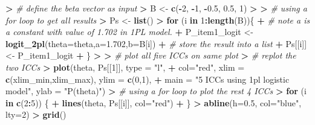 \documentclass[
]{article}
\newenvironment{Shaded}{\begin{snugshade}}{\end{snugshade}}
\newcommand{\AttributeTok}[1]{\textcolor[rgb]{0.13,0.29,0.53}{#1}}
\newcommand{\CommentTok}[1]{\textcolor[rgb]{0.56,0.35,0.01}{\textit{#1}}}
\newcommand{\ControlFlowTok}[1]{\textcolor[rgb]{0.13,0.29,0.53}{\textbf{#1}}}
\newcommand{\DecValTok}[1]{\textcolor[rgb]{0.00,0.00,0.81}{#1}}
\newcommand{\ErrorTok}[1]{\textcolor[rgb]{0.64,0.00,0.00}{\textbf{#1}}}
\newcommand{\FloatTok}[1]{\textcolor[rgb]{0.00,0.00,0.81}{#1}}
\newcommand{\FunctionTok}[1]{\textcolor[rgb]{0.13,0.29,0.53}{\textbf{#1}}}
\newcommand{\NormalTok}[1]{#1}
\newcommand{\OtherTok}[1]{\textcolor[rgb]{0.56,0.35,0.01}{#1}}
\newcommand{\SpecialCharTok}[1]{\textcolor[rgb]{0.81,0.36,0.00}{\textbf{#1}}}
\newcommand{\StringTok}[1]{\textcolor[rgb]{0.31,0.60,0.02}{#1}}
\begin{document}
\begin{Shaded}
\begin{Highlighting}[]
\SpecialCharTok{\textgreater{}} \CommentTok{\# define the beta vector as input}
\ErrorTok{\textgreater{}}\NormalTok{ B }\OtherTok{\textless{}{-}} \FunctionTok{c}\NormalTok{(}\SpecialCharTok{{-}}\DecValTok{2}\NormalTok{, }\SpecialCharTok{{-}}\DecValTok{1}\NormalTok{, }\SpecialCharTok{{-}}\FloatTok{0.5}\NormalTok{, }\FloatTok{0.5}\NormalTok{, }\DecValTok{1}\NormalTok{)}
\SpecialCharTok{\textgreater{}} 
\ErrorTok{\textgreater{}} \CommentTok{\# using a for loop to get all results}
\ErrorTok{\textgreater{}}\NormalTok{ Ps }\OtherTok{\textless{}{-}} \FunctionTok{list}\NormalTok{()}
\SpecialCharTok{\textgreater{}} \ControlFlowTok{for}\NormalTok{ (i }\ControlFlowTok{in} \DecValTok{1}\SpecialCharTok{:}\FunctionTok{length}\NormalTok{(B))\{}
\SpecialCharTok{+}   \CommentTok{\# note a is a constant with value of 1.702 in 1PL model.}
\SpecialCharTok{+}\NormalTok{   P\_item1\_logit }\OtherTok{\textless{}{-}} \FunctionTok{logit\_2pl}\NormalTok{(}\AttributeTok{theta=}\NormalTok{theta,}\AttributeTok{a=}\FloatTok{1.702}\NormalTok{,}\AttributeTok{b=}\NormalTok{B[i])}
\SpecialCharTok{+}   \CommentTok{\# store the result into a list}
\SpecialCharTok{+}\NormalTok{   Ps[[i]] }\OtherTok{\textless{}{-}}\NormalTok{ P\_item1\_logit}
\SpecialCharTok{+}\NormalTok{ \}}
\SpecialCharTok{\textgreater{}} 
\ErrorTok{\textgreater{}} \CommentTok{\# plot all five ICCs on same plot}
\ErrorTok{\textgreater{}} \CommentTok{\# replot the two ICCs}
\ErrorTok{\textgreater{}} \FunctionTok{plot}\NormalTok{(theta, Ps[[}\DecValTok{1}\NormalTok{]], }\AttributeTok{type =} \StringTok{"l"}\NormalTok{, }
\SpecialCharTok{+}      \AttributeTok{col=}\StringTok{"red"}\NormalTok{, }\AttributeTok{xlim =} \FunctionTok{c}\NormalTok{(xlim\_min,xlim\_max), }\AttributeTok{ylim =} \FunctionTok{c}\NormalTok{(}\DecValTok{0}\NormalTok{,}\DecValTok{1}\NormalTok{),}
\SpecialCharTok{+}      \AttributeTok{main =} \StringTok{"5 ICCs using 1pl logistic model"}\NormalTok{, }\AttributeTok{ylab =} \StringTok{"P(theta)"}\NormalTok{)}
\SpecialCharTok{\textgreater{}} \CommentTok{\# using a for loop to plot the rest 4 ICCs}
\ErrorTok{\textgreater{}} \ControlFlowTok{for}\NormalTok{ (i }\ControlFlowTok{in} \FunctionTok{c}\NormalTok{(}\DecValTok{2}\SpecialCharTok{:}\DecValTok{5}\NormalTok{)) \{}
\SpecialCharTok{+}   \FunctionTok{lines}\NormalTok{(theta, Ps[[i]], }\AttributeTok{col=}\StringTok{"red"}\NormalTok{)}
\SpecialCharTok{+}\NormalTok{ \}}
\SpecialCharTok{\textgreater{}} \FunctionTok{abline}\NormalTok{(}\AttributeTok{h=}\FloatTok{0.5}\NormalTok{, }\AttributeTok{col=}\StringTok{"blue"}\NormalTok{, }\AttributeTok{lty=}\DecValTok{2}\NormalTok{)}
\SpecialCharTok{\textgreater{}} \FunctionTok{grid}\NormalTok{()}
\end{Highlighting}
\end{Shaded}
\end{document}
